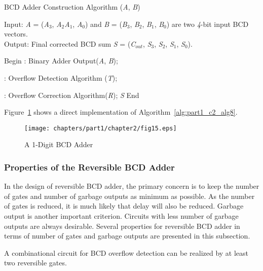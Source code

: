 \begin{algorithm}[!tbh]
	\caption{BCD Adder Construction Algorithm ({\it A}, {\it B})}
	\label{alg:part1_c2_alg8}
	Input: {\it A }= ({\it A}${}_{3}$, {\it A}${}_{2}${\it A}${}_{1}$, {\it A}${}_{0}$) and {\it B }= ({\it B}${}_{3}$, {\it B}${}_{2}$, {\it B}${}_{1}$, {\it B}${}_{0}$) are two {\it 4}-bit input BCD vectors.\\
	Output: Final corrected BCD sum {\it S }= ({\it C}${}_{out}$, {\it S}${}_{3}$, {\it S}${}_{2}$, {\it S}${}_{1}$, {\it S}${}_{0}$).\\
	\begin{algorithmic}[1]
		\STATE Begin
		: Binary Adder Output({\it A}, {\it B});
		
		: Overflow Detection Algorithm ({\it T});
		
		: Overflow Correction Algorithm({\it R});
		 {\it S}
		\STATE End
	\end{algorithmic}
\end{algorithm}

\begin{example}\textnormal{	Figure~\ref{fig:p1_c2_fig15} shows a direct implementation of Algorithm~\ref{alg:part1_c2_alg8}.}
\end{example}

\begin{figure}[!tbh]
	\centering
	\texttt{[image: chapters/part1/chapter2/fig15.eps]}
	\caption{A 1-Digit BCD Adder}
	\label{fig:p1_c2_fig15}
\end{figure}

\subsubsection{Properties of the Reversible BCD Adder}

In the design of reversible BCD adder, the primary concern is to keep the number of gates and number of garbage outputs as minimum as possible. As the number of gates is reduced, it is much likely that delay will also be reduced. Garbage output is another important criterion. Circuits with less number of garbage outputs are always desirable. Several properties for reversible BCD adder in terms of number of gates and garbage outputs are presented in this subsection.
\begin{property}\label{p_c2_l_3}\textnormal{
		A combinational circuit for BCD overflow detection can be realized by at least two reversible gates.}
\end{property}

